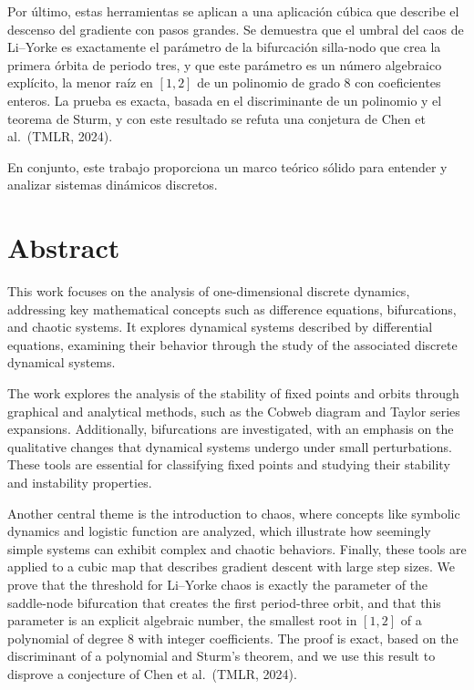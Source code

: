 \documentclass[12pt,a4paper]{report}
\theoremstyle{definition}
\begin{document}
Por último, estas herramientas se aplican a una aplicación cúbica que describe el descenso del gradiente con pasos grandes. Se demuestra que el umbral del caos de Li--Yorke es exactamente el parámetro de la bifurcación silla-nodo que crea la primera órbita de periodo tres, y que este parámetro es un número algebraico explícito, la menor raíz en $[1,2]$ de un polinomio de grado $8$ con coeficientes enteros. La prueba es exacta, basada en el discriminante de un polinomio y el teorema de Sturm, y con este resultado se refuta una conjetura de Chen et al.\ (TMLR, 2024).

En conjunto, este trabajo proporciona un marco teórico sólido para entender y analizar sistemas dinámicos discretos.

\section*{Abstract}

This work focuses on the analysis of one-dimensional discrete dynamics, addressing key mathematical concepts such as difference equations, bifurcations, and chaotic systems. It explores dynamical systems described by differential equations, examining their behavior through the study of the associated discrete dynamical systems.

The work explores the analysis of the stability of fixed points and orbits through graphical and analytical methods, such as the Cobweb diagram and Taylor series expansions. Additionally, bifurcations are investigated, with an emphasis on the qualitative changes that dynamical systems undergo under small perturbations. These tools are essential for classifying fixed points and studying their stability and instability properties.

Another central theme is the introduction to chaos, where concepts like symbolic dynamics and logistic function are analyzed, which illustrate how seemingly simple systems can exhibit complex and chaotic behaviors.
Finally, these tools are applied to a cubic map that describes gradient descent with large step sizes. We prove that the threshold for Li--Yorke chaos is exactly the parameter of the saddle-node bifurcation that creates the first period-three orbit, and that this parameter is an explicit algebraic number, the smallest root in $[1,2]$ of a polynomial of degree $8$ with integer coefficients. The proof is exact, based on the discriminant of a polynomial and Sturm's theorem, and we use this result to disprove a conjecture of Chen et al.\ (TMLR, 2024).
\end{document}
